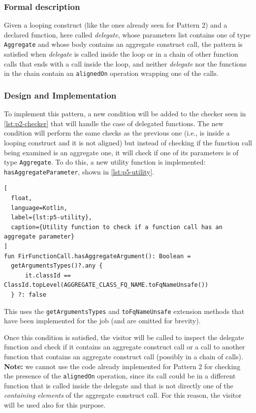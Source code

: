 \documentclass[12pt,a4paper,openright,twoside]{book}
\begin{document}


\subsubsection{Formal description}

Given a looping construct (like the ones already seen for Pattern 2) and a
declared function, here called \emph{delegate}, whose parameters list contains
one of type \lstinline{Aggregate} and whose body contains an aggregate construct
call, the pattern is satisfied when \emph{delegate} is called inside the loop or
in a chain of other function calls that ends with a call inside the loop, and
neither \emph{delegate} nor the functions in the chain contain an
\lstinline{alignedOn} operation wrapping one of the calls.

\subsubsection{Design and Implementation}

To implement this pattern, a new condition will be added to the checker seen in
\cref{lst:p2-checker} that will handle the case of delegated functions. The new
condition will perform the same checks as the previous one (i.e., is inside a
looping construct and it is not aligned) but instead of checking if the function
call being examined is an aggregate one, it will check if one of its parameters
is of type \lstinline{Aggregate}. To do this, a new utility function is
implemented: \lstinline{hasAggregateParameter}, shown in \cref{lst:p5-utility}.
%
\begin{lstlisting}[
  float, 
  language=Kotlin,
  label={lst:p5-utility},
  caption={Utility function to check if a function call has an aggregate parameter}
]
fun FirFunctionCall.hasAggregateArgument(): Boolean =
  getArgumentsTypes()?.any {
      it.classId == ClassId.topLevel(AGGREGATE_CLASS_FQ_NAME.toFqNameUnsafe())
  } ?: false 
\end{lstlisting}
%
This uses the \lstinline{getArgumentsTypes} and \lstinline{toFqNameUnsafe}
extension methods that have been implemented for the job (and are omitted for
brevity). 

Once this condition is satisfied, the visitor will be called to
inspect the delegate function and check if it contains an aggregate construct
call or a call to another function that contains an aggregate construct call
(possibly in a chain of calls). \textbf{Note:} we cannot use the code already
implemented for Pattern 2 for checking the presence of the \lstinline{alignedOn}
operation, since its call could be in a different function that is called inside
the delegate and that is not directly one of the \emph{containing elements} of
the aggregate construct call. For this reason, the visitor will be used also for
this purpose.
\end{document}
